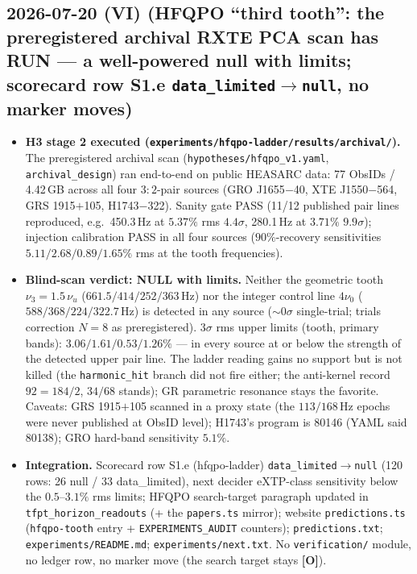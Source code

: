 \documentclass[11pt]{article}
\providecommand{\mO}{\textbf{[O]}}\providecommand{\mX}{\textbf{[X]}}
\begin{document}
\subsection*{2026-07-20 (VI) (HFQPO ``third tooth'': the preregistered archival RXTE PCA scan has RUN --- a well-powered null with limits; scorecard row S1.e \texttt{data\_limited}$\to$\texttt{null}, no marker moves)}
\begin{itemize}[leftmargin=1.5em]
\item \textbf{H3 stage 2 executed (\texttt{experiments/hfqpo-ladder/results/archival/}).} The preregistered
archival scan (\texttt{hypotheses/hfqpo\_v1.yaml}, \texttt{archival\_design}) ran end-to-end on public
HEASARC data: 77 ObsIDs / 4.42\,GB across all four $3{:}2$-pair sources (GRO J1655$-$40, XTE J1550$-$564,
GRS 1915$+$105, H1743$-$322). Sanity gate PASS (11/12 published pair lines reproduced, e.g.\ 450.3\,Hz at
$5.37\%$ rms $4.4\sigma$, 280.1\,Hz at $3.71\%$ $9.9\sigma$); injection calibration PASS in all four
sources ($90\%$-recovery sensitivities $5.11/2.68/0.89/1.65\%$ rms at the tooth frequencies).
\item \textbf{Blind-scan verdict: NULL with limits.} Neither the geometric tooth $\nu_3=1.5\,\nu_u$
($661.5/414/252/363$\,Hz) nor the integer control line $4\nu_0$ ($588/368/224/322.7$\,Hz) is detected in
any source ($\sim\!0\sigma$ single-trial; trials correction $N{=}8$ as preregistered). $3\sigma$ rms upper
limits (tooth, primary bands): $3.06/1.61/0.53/1.26\%$ --- in every source at or below the strength of the
detected upper pair line. The ladder reading gains no support but is not killed (the \texttt{harmonic\_hit}
branch did not fire either; the anti-kernel record $92{=}184/2$, $34/68$ stands); GR parametric resonance
stays the favorite. Caveats: GRS 1915$+$105 scanned in a proxy state (the $113/168$\,Hz epochs were never
published at ObsID level); H1743's program is 80146 (YAML said 80138); GRO hard-band sensitivity $5.1\%$.
\item \textbf{Integration.} Scorecard row S1.e (hfqpo-ladder) \texttt{data\_limited}$\to$\texttt{null}
(120 rows: 26 null / 33 data\_limited), next decider eXTP-class sensitivity below the $0.5$--$3.1\%$ rms
limits; HFQPO search-target paragraph updated in \texttt{tfpt\_horizon\_readouts} (+ the
\texttt{papers.ts} mirror); website \texttt{predictions.ts} (\texttt{hfqpo-tooth} entry +
\texttt{EXPERIMENTS\_AUDIT} counters); \texttt{predictions.txt}; \texttt{experiments/README.md};
\texttt{experiments/next.txt}. No \texttt{verification/} module, no ledger row, no marker move
(the search target stays \mO).
\end{itemize}
\end{document}

